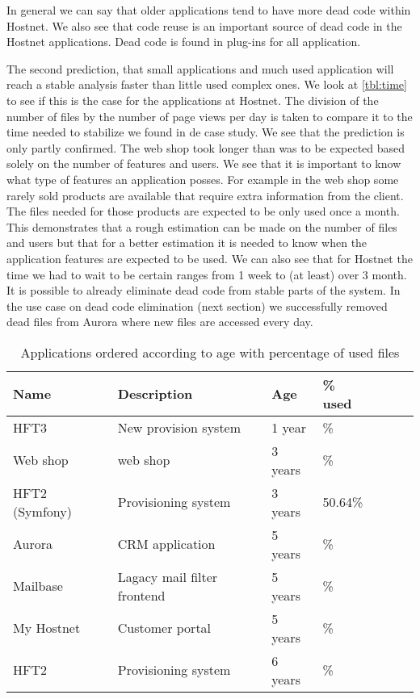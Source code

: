 In general we can say that older applications tend to have more dead code within Hostnet. We also see that code reuse is an important source of dead code in the Hostnet applications. Dead code is found in plug-ins for all application.

The second prediction, that small applications and much used application  will reach a stable analysis faster than little used complex ones. We look at \autoref{tbl:time} to see if this is the case for the applications at Hostnet. The division of the number of files by the number of page views per day is taken to compare it to the time needed to stabilize we found in de case study. We see that the prediction is only partly confirmed. The web shop took longer than was to be expected based solely on the number of features and users. We see that it is important to know what type of features an application posses. For example in the web shop some rarely sold products are available that require extra information from the client. The files needed for those products are expected to be only used once a month. This demonstrates that a rough estimation can be made on the number of files and users but that for a better estimation it is needed to know when the application features are expected to be used. We can also see that for Hostnet the time we had to wait to be certain ranges from 1 week to (at least) over 3 month. It is possible to already eliminate dead code from stable parts of the system. In the use case on dead code elimination (next section) we successfully removed dead files from Aurora where new files are accessed every day.

\begin{table}[p]
	\small
	\centering
	\begin{tabular}{|l|l|l|l|l|c|c|}
	\hline
	Name & Description & Age & \% used\\
	\hline
	HFT3    		         & New provision system         & 1 year  & \HftThreestrippedPctAlive\% \\
	Web shop             & web shop                     & 3 years & \OntrackPctAlive\%          \\
	HFT2 (Symfony)       & Provisioning system          & 3 years & 50.64\%                     \\
	Aurora               & CRM application              & 5 years & \AuroraPctAlive\%           \\
	Mailbase             & Lagacy mail filter frontend  & 5 years & \MailbasePctAlive\%         \\
	My Hostnet           & Customer portal              & 5 years & \MyTwoPctAlive\%            \\
	HFT2\footnotemark    & Provisioning system          & 6 years & \HftTwoPctAlive\%           \\
	\hline
	\end{tabular}
	\caption{Applications ordered according to age with percentage of used files\label{tbl:used}}
\end{table}

